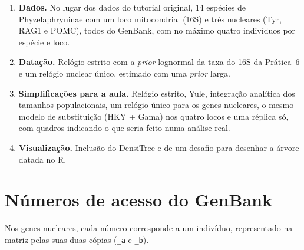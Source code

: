\documentclass[11pt,a4paper]{article}
\begin{document}
\begin{enumerate}
\item \textbf{Dados.} No lugar dos dados do tutorial original, 14 espécies de Phyzelaphryninae
com um loco mitocondrial (16S) e três nucleares (Tyr, RAG1 e POMC), todos do GenBank, com no
máximo quatro indivíduos por espécie e loco.
\item \textbf{Datação.} Relógio estrito com a \emph{prior} lognormal da taxa do 16S da
Prática~6 e um relógio nuclear único, estimado com uma \emph{prior} larga.
\item \textbf{Simplificações para a aula.} Relógio estrito, Yule, integração analítica dos
tamanhos populacionais, um relógio único para os genes nucleares, o mesmo modelo de
substituição (HKY + Gama) nos quatro locos e uma réplica só, com quadros indicando o que seria
feito numa análise real.
\item \textbf{Visualização.} Inclusão do DensiTree e de um desafio para desenhar a árvore datada
no R.
\end{enumerate}

\needspace{0.45\textheight}
\section{Números de acesso do GenBank}\label{ap:acessos}

Nos genes nucleares, cada número corresponde a um indivíduo, representado na matriz pelas suas
duas cópias (\texttt{\_a} e \texttt{\_b}).
\end{document}
